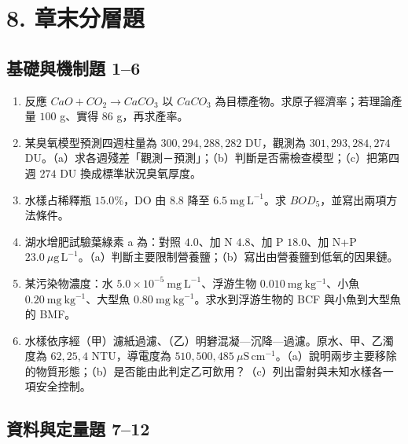 \documentclass[11pt,a4paper]{article}
\providecommand{\tightlist}{%
  \setlength{\itemsep}{0pt}\setlength{\parskip}{0pt}}
\begin{document}
\section{8. 章末分層題}\label{ux7ae0ux672bux5206ux5c64ux984c}

\subsection{基礎與機制題 1--6}\label{ux57faux790eux8207ux6a5fux5236ux984c-16}

\begin{enumerate}
\def\labelenumi{\arabic{enumi}.}
\tightlist
\item
  反應 \(CaO+CO_2\rightarrow CaCO_3\) 以 \(CaCO_3\) 為目標產物。求原子經濟率；若理論產量 \(100\) g、實得 \(86\) g，再求產率。
\item
  某臭氧模型預測四週柱量為 \(300,294,288,282\) DU，觀測為 \(301,293,284,274\) DU。（a）求各週殘差「觀測－預測」；（b）判斷是否需檢查模型；（c）把第四週 \(274\) DU 換成標準狀況臭氧厚度。
\item
  水樣占稀釋瓶 \(15.0\%\)，DO 由 \(8.8\) 降至 \(6.5\ \mathrm{mg\ L^{-1}}\)。求 \(BOD_5\)，並寫出兩項方法條件。
\item
  湖水增肥試驗葉綠素 a 為：對照 \(4.0\)、加 N \(4.8\)、加 P \(18.0\)、加 N+P \(23.0\ \mu\mathrm{g\,L^{-1}}\)。（a）判斷主要限制營養鹽；（b）寫出由營養鹽到低氧的因果鏈。
\item
  某污染物濃度：水 \(5.0\times10^{-5}\ \mathrm{mg\ L^{-1}}\)、浮游生物 \(0.010\ \mathrm{mg\ kg^{-1}}\)、小魚 \(0.20\ \mathrm{mg\ kg^{-1}}\)、大型魚 \(0.80\ \mathrm{mg\ kg^{-1}}\)。求水到浮游生物的 BCF 與小魚到大型魚的 BMF。
\item
  水樣依序經（甲）濾紙過濾、（乙）明礬混凝---沉降---過濾。原水、甲、乙濁度為 \(62,25,4\) NTU，導電度為 \(510,500,485\ \mu\mathrm{S\,cm^{-1}}\)。（a）說明兩步主要移除的物質形態；（b）是否能由此判定乙可飲用？（c）列出雷射與未知水樣各一項安全控制。
\end{enumerate}

\subsection{資料與定量題 7--12}\label{ux8cc7ux6599ux8207ux5b9aux91cfux984c-712}
\end{document}
